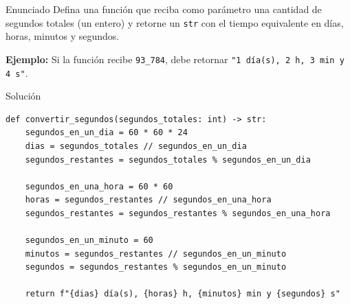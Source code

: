 \documentclass{ip-quiz}
\begin{document}
\makeheader
\maketitle

\begin{sectionbox}{Enunciado}
Defina una función que reciba como parámetro una cantidad de segundos totales (un entero) y retorne un \texttt{str} con el tiempo equivalente en días, horas, minutos y segundos.

\textbf{Ejemplo:} Si la función recibe \texttt{93\_784}, debe retornar \texttt{"1 día(s), 2 h, 3 min y 4 s"}.
\end{sectionbox}

\begin{sectionbox}{Solución}
\begin{verbatim}
def convertir_segundos(segundos_totales: int) -> str:
    segundos_en_un_dia = 60 * 60 * 24
    dias = segundos_totales // segundos_en_un_dia
    segundos_restantes = segundos_totales % segundos_en_un_dia

    segundos_en_una_hora = 60 * 60
    horas = segundos_restantes // segundos_en_una_hora
    segundos_restantes = segundos_restantes % segundos_en_una_hora

    segundos_en_un_minuto = 60
    minutos = segundos_restantes // segundos_en_un_minuto
    segundos = segundos_restantes % segundos_en_un_minuto

    return f"{dias} día(s), {horas} h, {minutos} min y {segundos} s"
\end{verbatim}
\end{sectionbox}
\end{document}
